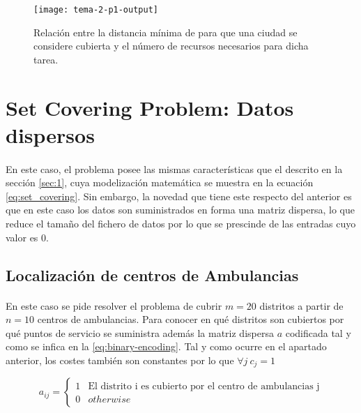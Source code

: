 \documentclass[spanish]{article}
\begin{document}
			\begin{figure}[h]
				\begin{center}
					\texttt{[image: tema-2-p1-output]}
				\end{center}
				\caption{Relación entre la distancia mínima de para que una ciudad se considere cubierta y el número de recursos necesarios para dicha tarea.}
				\label{fig:sol-1.2}
			\end{figure}

	\section{Set Covering Problem: Datos dispersos}
	\label{sec:2}

    \paragraph{}
		En este caso, el problema posee las mismas características que el descrito en la sección \ref{sec:1}, cuya modelización matemática se muestra en la ecuación \eqref{eq:set_covering}. Sin embargo, la novedad que tiene este respecto del anterior es que en este caso los datos son suministrados en forma una matriz dispersa, lo que reduce el tamaño del fichero de datos por lo que se prescinde de las entradas cuyo valor es $0$.

		\subsection{Localización de centros de Ambulancias}
		\label{sec:2.1}

			\paragraph{}
			En este caso se pide resolver el problema de cubrir $m = 20$ distritos a partir de $n = 10$ centros de ambulancias. Para conocer en qué distritos son cubiertos por qué puntos de servicio se suministra además la matriz dispersa $a$ codificada tal y como se infica en la \eqref{eq:binary-encoding}. Tal y como ocurre en el apartado anterior, los costes también son constantes por lo que $\forall j \ c_{j} = 1$

			\begin{equation}
			\label{eq:binary-encoding}
				a_{ij}  =
					\begin{cases}
		      	1 & \text{El distrito i es cubierto por el centro de ambulancias j}\\
		      	0 & otherwise
			   	\end{cases}
			\end{equation}
\end{document}

